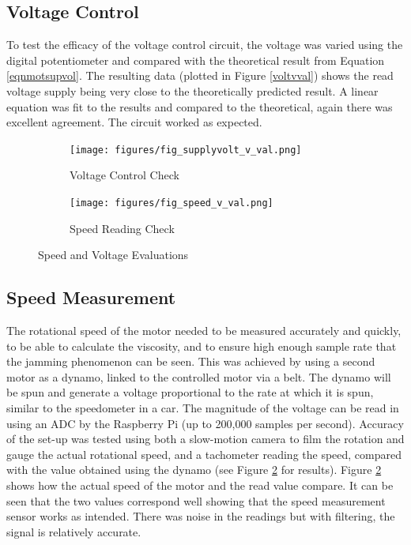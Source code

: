 \documentclass[twoside,a4]{report}
\def\br{\newline \newline \noindent}
\begin{document}
	\subsection*{Voltage Control}
	To test the efficacy of the voltage control circuit, the voltage was varied using the digital potentiometer and compared with the theoretical result from Equation \ref{eqnmotsupvol}. The resulting data (plotted in Figure \ref{voltvval}) shows the read voltage supply being very close to the theoretically predicted result. A linear equation was fit to the results and compared to the theoretical, again there was excellent agreement. The circuit worked as expected.
	\begin{figure}[!htb]
		\centering
		\begin{subfigure}[t]{0.45\textwidth}
			\centering
			\texttt{[image: figures/fig\_supplyvolt\_v\_val.png]}
			\caption{Voltage Control Check}
			\label{figvoltvval}
		\end{subfigure}
		\begin{subfigure}[t]{0.45\textwidth}
			\centering
			\texttt{[image: figures/fig\_speed\_v\_val.png]}
			\caption{Speed Reading Check}
			\label{figdynocheck}
		\end{subfigure}
		\label{figspeecal}
		\caption{Speed and Voltage Evaluations}
	\end{figure} \newline  \noindent

	\subsection*{Speed Measurement} %
	The rotational speed of the motor needed to be measured accurately and quickly, to be able to calculate the viscosity, and to ensure high enough sample rate that the jamming phenomenon can be seen. This was achieved by using a second motor as a dynamo, linked to the controlled motor via a belt. The dynamo will be spun and generate a voltage proportional to the rate at which it is spun, similar to the speedometer in a car. The magnitude of the voltage can be read in using an ADC by the Raspberry Pi (up to 200,000 samples per second). Accuracy of the set-up was tested using both a slow-motion camera to film the rotation and gauge the actual rotational speed, and a tachometer reading the speed, compared with the value obtained using the dynamo (see Figure \ref{figdynocheck} for results). \br
	Figure \ref{figdynocheck} shows how the actual speed of the motor and the read value compare. It can be seen that the two values correspond well showing that the speed measurement sensor works as intended. There was noise in the readings but with filtering, the signal is relatively accurate.\br
	
\end{document}
